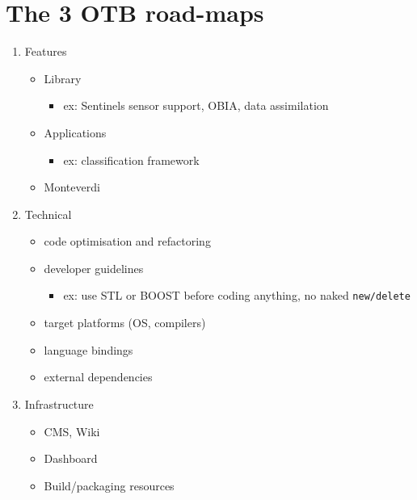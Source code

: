 \documentclass[8pt]{beamer}
\begin{document}
\section{The 3 OTB road-maps}
\label{sec-7}
\begin{enumerate}
\item Features
\begin{itemize}
\item Library
\begin{itemize}
\item ex: Sentinels sensor support, OBIA, data assimilation
\end{itemize}
\item Applications
\begin{itemize}
\item ex: classification framework
\end{itemize}
\item Monteverdi
\end{itemize}
\item Technical
\begin{itemize}
\item code optimisation and refactoring
\item developer guidelines
\begin{itemize}
\item ex: use STL or BOOST before coding anything, no naked \verb~new/delete~
\end{itemize}
\item target platforms (OS, compilers)
\item language bindings
\item external dependencies
\end{itemize}
\item Infrastructure
\begin{itemize}
\item CMS, Wiki
\item Dashboard
\item Build/packaging resources
\end{itemize}
\end{enumerate}
\end{document}
